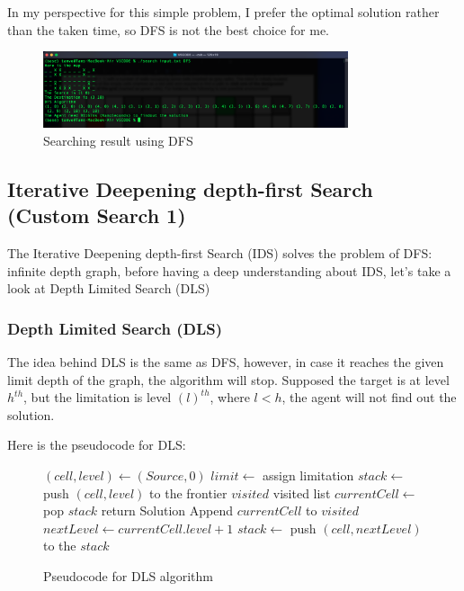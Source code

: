 \documentclass{assignment}
\begin{document}
In my perspective for this simple problem, I prefer the optimal solution rather than the taken time, so DFS is not the best choice for me.

\begin{figure}[h]
    \centering
    \includegraphics[width=0.8\textwidth]{./assets/DFS.png}
    \caption{Searching result using DFS}
    \label{fig:fig6}
\end{figure}

\subsection{Iterative Deepening depth-first Search (Custom Search 1)}
The Iterative Deepening depth-first Search (IDS) solves the problem of DFS: infinite depth graph, before having a deep understanding about IDS, let's take a look at Depth Limited Search (DLS)

\subsubsection{Depth Limited Search (DLS)}

The idea behind DLS is the same as DFS, however, in case it reaches the given limit depth of the graph, the algorithm will stop. Supposed the target is at level $h^{th}$, but the limitation is level $(l)^{th}$, where $l < h$, the agent will not find out the solution.

Here is the pseudocode for DLS:

\begin{figure}[htbp]
    \centering
    \begin{mdframed}
      \begin{algorithmic}
        \STATE $(cell, level) \gets (Source, 0)$
        \STATE $limit \gets$ assign limitation
        \STATE $stack \gets $ push $(cell, level)$ to the frontier
        \STATE $visited$ visited list
            \STATE $currentCell \gets$ pop $stack$
            	\STATE return Solution
            \ENDIF
            \STATE Append $currentCell$ to $visited$ 
            	\STATE $nextLevel \gets currentCell.level + 1$
                    \STATE $stack \gets $ push $(cell, nextLevel)$ to the $stack$
                \ENDIF
            \ENDFOR
        \ENDWHILE
      \end{algorithmic}
    \end{mdframed}
    \caption{Pseudocode for DLS algorithm}
    \label{fig:fig7}
 \end{figure}
 
\end{document}
